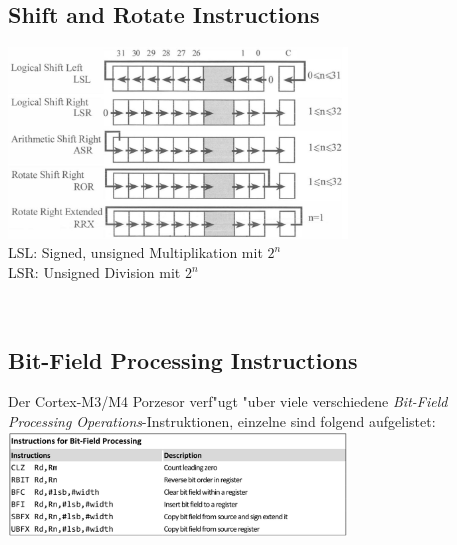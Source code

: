 \begin{minipage}[t]{9cm}
	\subsection{Shift and Rotate Instructions}
	\includegraphics[width=9cm]{images/shiftandrotate}\\
	LSL: Signed, unsigned Multiplikation mit $2^n$\\
	LSR: Unsigned Division mit $2^n$
	
\end{minipage}
%
\begin{minipage}[t]{0.5cm}
	\-\
\end{minipage}
%
\begin{minipage}[t]{9cm}
	\subsection{Bit-Field Processing Instructions}
		Der Cortex-M3/M4 Porzesor verf"ugt "uber viele verschiedene \textit{Bit-Field Processing Operations}-Instruktionen, einzelne sind folgend aufgelistet:\\

		\includegraphics[width=9cm]{images/bit-field-processing}
\end{minipage}


